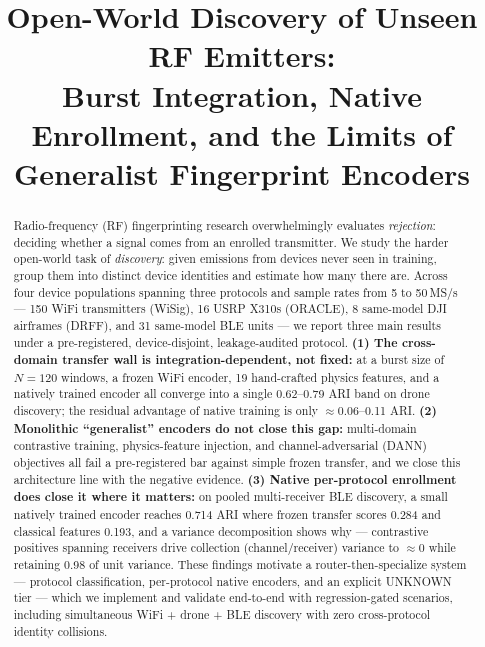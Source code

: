 \documentclass[conference]{IEEEtran}
\newcommand{\todo}[1]{\textcolor{red}{[TODO: #1]}}
\begin{document}
\title{Open-World Discovery of Unseen RF Emitters:\\
Burst Integration, Native Enrollment, and the Limits of Generalist Fingerprint Encoders}

\author{
\IEEEauthorblockA{\todo{affiliation, advisor, email}}}

\maketitle

\begin{abstract}
Radio-frequency (RF) fingerprinting research overwhelmingly evaluates \emph{rejection}: deciding
whether a signal comes from an enrolled transmitter. We study the harder open-world task of
\emph{discovery}: given emissions from devices never seen in training, group them into distinct
device identities and estimate how many there are. Across four device populations spanning three
protocols and sample rates from 5 to 50\,MS/s --- 150 WiFi transmitters (WiSig), 16 USRP X310s
(ORACLE), 8 same-model DJI airframes (DRFF), and 31 same-model BLE units --- we report three main
results under a pre-registered, device-disjoint, leakage-audited protocol. \textbf{(1) The
cross-domain transfer wall is integration-dependent, not fixed:} at a burst size of $N{=}120$
windows, a frozen WiFi encoder, 19 hand-crafted physics features, and a natively trained encoder
all converge into a single 0.62--0.79 ARI band on drone discovery; the residual advantage of
native training is only $\approx$0.06--0.11 ARI. \textbf{(2) Monolithic ``generalist'' encoders do
not close this gap:} multi-domain contrastive training, physics-feature injection, and
channel-adversarial (DANN) objectives all fail a pre-registered bar against simple frozen
transfer, and we close this architecture line with the negative evidence. \textbf{(3) Native
per-protocol enrollment does close it where it matters:} on pooled multi-receiver BLE discovery, a
small natively trained encoder reaches 0.714 ARI where frozen transfer scores 0.284 and classical
features 0.193, and a variance decomposition shows why --- contrastive positives spanning
receivers drive collection (channel/receiver) variance to $\approx$0 while retaining 0.98 of
unit variance. These findings motivate a router-then-specialize system --- protocol
classification, per-protocol native encoders, and an explicit UNKNOWN tier --- which we implement
and validate end-to-end with regression-gated scenarios, including simultaneous WiFi + drone + BLE
discovery with zero cross-protocol identity collisions.
\end{abstract}
\end{document}
